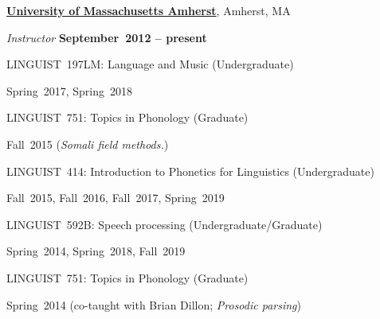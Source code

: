\documentclass[10pt]{article}
\newcommand{\halfblankline}{\quad\vspace{-0.5\baselineskip}\pagebreak[3]}
\begin{document}
\href{http://www.umass.edu}{\textbf{University of Massachusetts Amherst}},
Amherst, MA
\begin{outerlist}

\item[] \textit{Instructor}%
    \hfill \textbf{September~2012 -- present}
    \begin{innerlist}

        \item LINGUIST~197LM:
          Language and Music (Undergraduate)
        \begin{innerlist}[\enskip$\circ$,leftmargin=*]
            \item Spring~2017, Spring~2018
        \end{innerlist}

        \item LINGUIST~751:
          Topics in Phonology (Graduate)
        \begin{innerlist}[\enskip$\circ$,leftmargin=*]
            \item Fall~2015 (\emph{Somali field methods.})
        \end{innerlist}

        \halfblankline
        \item LINGUIST~414:
          Introduction to Phonetics for Linguistics (Undergraduate)
        \begin{innerlist}[\enskip$\circ$,leftmargin=*]
            \item Fall~2015, Fall~2016, Fall~2017, Spring~2019
        \end{innerlist}


        \halfblankline
        \item LINGUIST~592B:
          Speech processing (Undergraduate/Graduate)
        \begin{innerlist}[\enskip$\circ$,leftmargin=*]
            \item Spring~2014, Spring~2018, Fall~2019
        \end{innerlist}

        \halfblankline

        \item LINGUIST~751:
          Topics in Phonology (Graduate)
        \begin{innerlist}[\enskip$\circ$,leftmargin=*]
            \item Spring~2014 (co-taught with Brian Dillon;
              \emph{Prosodic parsing})
        \end{innerlist}


\end{innerlist}
\end{outerlist}
\end{document}
